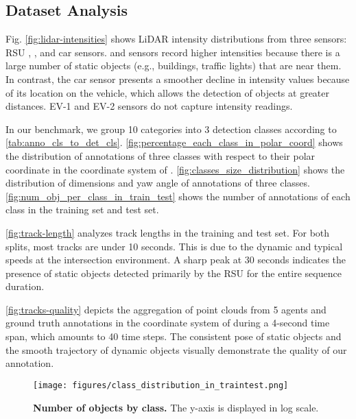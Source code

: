\subsection{Dataset Analysis}  \label{sec:dataset_analysis}

Fig. \ref{fig:lidar-intensities} shows LiDAR intensity distributions from three sensors: RSU \rsutop, \rsudome, and \laser car sensors. 
\rsudome and \rsutop sensors record higher intensities because there is a large number of static objects (e.g., buildings, traffic lights) that are near them.
In contrast, the \laser car sensor presents a smoother decline in intensity values because of its location on the vehicle, which allows the detection of objects at greater distances. 
EV-1 and EV-2 sensors do not capture intensity readings.

In our benchmark, we group 10 categories into 3 detection classes according to \autoref{tab:anno_cls_to_det_cls}. \autoref{fig:percentage_each_class_in_polar_coord} shows the distribution of annotations of three classes with respect to their polar coordinate in the coordinate system of \rsutop. \autoref{fig:classes_size_distribution} shows the distribution of dimensions and yaw angle of annotations of three classes. 
\autoref{fig:num_obj_per_class_in_train_test} shows the number of annotations of each class in the training set and test set.

\autoref{fig:track-length} analyzes track lengths in the training and test set. For both splits, most tracks are under 10 seconds. This is due to the dynamic and typical speeds at the intersection environment. A sharp peak at 30 seconds indicates the presence of static objects detected primarily by the RSU for the entire sequence duration.

\autoref{fig:tracks-quality} depicts the aggregation of point clouds from 5 agents and ground truth annotations in the coordinate system of \rsutop during a 4-second time span, which amounts to 40 time steps. 
The consistent pose of static objects and the smooth trajectory of dynamic objects visually demonstrate the quality of our annotation.



\begin{figure}[t!]
\centering
\texttt{[image: figures/class\_distribution\_in\_traintest.png]}

\vspace{-6px}
\caption{\small \textbf{Number of objects by class.} The y-axis is displayed in log scale.}
\label{fig:num_obj_per_class_in_train_test}

\vspace{-4px}

\end{figure}

